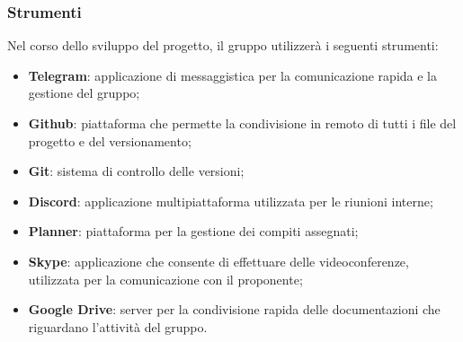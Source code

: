 \subsubsection{Strumenti}
Nel corso dello sviluppo del progetto, il gruppo utilizzerà i seguenti strumenti: 
\begin{itemize}
\item \textbf{Telegram\glo{}}: applicazione di messaggistica per la comunicazione rapida e la gestione del gruppo; 
\item \textbf{Github\glo{}}: piattaforma che permette la condivisione in remoto di tutti i file del progetto e del versionamento;
\item \textbf{Git\glo{}}: sistema di controllo delle versioni;
\item \textbf{Discord\glo{}}: applicazione multipiattaforma utilizzata per le riunioni interne;
\item \textbf{Planner\glo{}}: piattaforma per la gestione dei compiti assegnati;
\item \textbf{Skype\glo{}}: applicazione che consente di effettuare delle videoconferenze, utilizzata per la comunicazione con il proponente;
\item \textbf{Google Drive\glo{}}: server per la condivisione rapida delle documentazioni che riguardano l'attività del gruppo.
\end{itemize}
